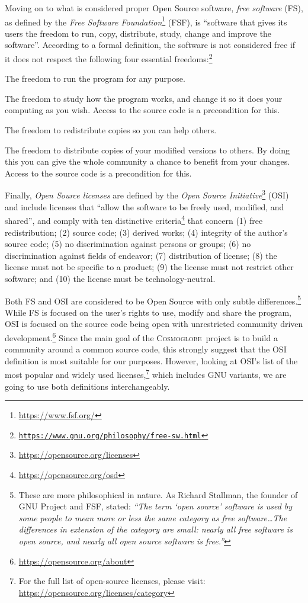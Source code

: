 \documentclass[twocolumn]{aa}
\newcommand{\cosmoglobe}{\textsc{Cosmoglobe}}
\begin{document}
Moving on to what is considered proper Open Source software, \textit{free software} (FS), as defined by the \textit{Free Software Foundation}\footnote{\url{https://www.fsf.org/}} (FSF), is ``software that gives its users the freedom to run, copy, distribute, study, change and improve the software''.  According to a formal definition, the software is not considered free if it does not respect the following four essential freedoms:\footnote{\href{https://www.gnu.org/philosophy/free-sw.html}
{\texttt{https://www.gnu.org/philosophy/free-sw.html}}}

 The freedom to run the program for any
purpose.

 The freedom to study how the program works,
and change it so it does your computing as you wish. Access to the
source code is a precondition for this.

 The freedom
to redistribute copies so you can help others.

 The
freedom to distribute copies of your modified versions to others. By
doing this you can give the whole community a chance to benefit from
your changes. Access to the source code is a precondition for this.

Finally, \textit{Open Source licenses} are defined by the \textit{Open Source Initiative}\footnote{\url{https://opensource.org/licenses}} (OSI) and include licenses that ``allow the software to be freely used, modified, and shared'', and comply with ten distinctive criteria\footnote{\url{https://opensource.org/osd}} that concern (1) free redistribution; (2) source code; (3) derived works; (4) integrity of the author's source code; (5) no discrimination against persons or groups; (6) no discrimination against fields of endeavor; (7) distribution of license; (8) the license must not be specific to a product; (9) the license must not restrict other software; and (10) the license must be technology-neutral.

Both FS and OSI are considered to be Open Source with only subtle
differences.\footnote{These are more philosophical in nature. As
  Richard Stallman, the founder of GNU Project and FSF, stated: \textit{``The
  term `open source' software is used by some people to mean more or
  less the same category as free software\ldots The differences in
  extension of the category are small: nearly all free software is
  open source, and nearly all open source software is free.''}} While FS
is focused on the user's rights to use, modify and share the program,
OSI is focused on the source code being open with unrestricted
community driven
development.\footnote{\url{https://opensource.org/about}} Since the main
goal of the \cosmoglobe\ project is to build a community around a
common source code, this strongly suggest that the OSI definition is
most suitable for our purposes. However, looking at OSI's list of
the most popular and widely used licenses,\footnote{For the full list
  of open-source licenses, please visit:
  \newline
  \url{https://opensource.org/licenses/category}}
which includes GNU variants, we are going to use both definitions
interchangeably. 
\end{document}
